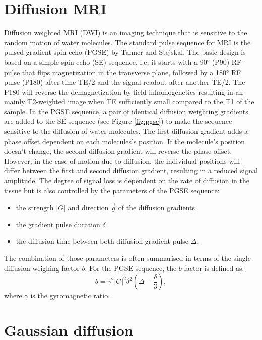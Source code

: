 \section{Diffusion MRI}
Diffusion weighted MRI (DWI) is an imaging technique that is sensitive to the random motion of water molecules. The standard pulse sequence for MRI is the pulsed gradient spin echo (PGSE) by Tanner and Stejskal\cite{tanner65}. The basic design is based on a simple spin echo (SE) sequence, i.e, it starts with a 90° (P90) RF-pulse that flips magnetization in the transverse plane, followed by a 180° RF pulse (P180) after time TE/2 and the signal readout after another TE/2. The P180 will reverse the demagnetization by field inhomogeneties resulting in an mainly T2-weighted image when TE sufficiently small compared to the T1 of the sample. In the PGSE sequence, a pair of identical diffusion weighting gradients are added to the SE sequence (see Figure \ref{fig:pgse}) to make the sequence sensitive to the diffusion of water molecules. The first diffusion gradient adds a phase offset dependent on each molecules's position. If the molecule's position doesn't change, the second diffusion gradient will reverse the phase offset. However, in the case of motion due to diffusion, the individual positions will differ between the first and second diffusion gradient, resulting in a reduced signal amplitude. The degree of signal loss is dependent on the rate of diffusion in the tissue but is also controlled by the parameters of the PGSE sequence:
\begin{itemize}
	\item the strength $|G|$ and direction $\vec{g}$ of the diffusion gradients
	\item the gradient pulse duration $\delta$
	\item the diffusion time between both diffusion gradient pulse $\Delta$.
\end{itemize}
The combination of those parameters is often summarised in terms of the single diffusion weighing factor $b$. For the PGSE sequence, the $b$-factor is defined as:
\begin{equation}
	b = \gamma^2|G|^2\delta^2(\Delta-\frac{\delta}{3}),
\end{equation}
where $\gamma$ is the gyromagnetic ratio.

\section{Gaussian diffusion}

